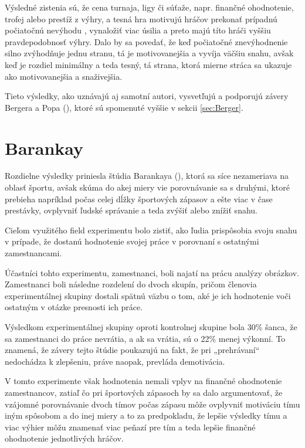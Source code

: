 \documentclass[
  digital, %
  oneside, %
  notable,   %
  lof,     %
  lot,     %
]{fithesis3}
\begin{document}
		Výsledné zistenia sú, že cena turnaja, ligy či súťaže, napr. finančné ohodnotenie, trofej alebo prestíž z výhry, a tesná hra motivujú hráčov prekonať prípadnú počiatočnú nevýhodu , vynaložiť viac úsilia a preto majú títo hráči vyššiu pravdepodobnosť výhry. \parencite[s.~20]{bergerhoff2015} Dalo by sa povedať, že keď počiatočné znevýhodnenie silno zvýhodňuje jednu stranu, tá je motivovanejšia a vyvíja väčšiu snahu, avšak keď je rozdiel minimálny a teda tesný, tá strana, ktorá mierne stráca sa ukazuje ako motivovanejšia a snaživejšia.
		
		Tieto výsledky, ako uznávajú aj samotní autori, vysvetľujú a podporujú závery Bergera a Popa (\citeyear{berger2011}), ktoré sú spomenuté vyššie v sekcii \ref{sec:Berger}.
		
		\section{Barankay}
		Rozdielne výsledky priniesla štúdia Barankaya (\citeyear{barankay2010}), ktorá sa síce nezameriava na oblasť športu, avšak skúma do akej miery vie porovnávanie sa s druhými, ktoré prebieha napríklad počas celej dĺžky športových zápasov a ešte viac v čase prestávky, ovplyvniť ľudské správanie a teda zvýšiť alebo znížiť snahu.
		
		Cieľom využitého field experimentu bolo zistiť, ako ľudia prispôsobia svoju snahu v prípade, že dostanú hodnotenie svojej práce v porovnaní s ostatnými zamestnancami. 
		
		Účastníci tohto experimentu, zamestnanci, boli najatí na prácu analýzy obrázkov. Zamestnanci boli následne rozdelení do dvoch skupín, pričom členovia experimentálnej skupiny dostali spätnú väzbu o tom, aké je ich hodnotenie voči ostatným v otázke presnosti ich práce. 
		
		Výsledkom experimentálnej skupiny oproti kontrolnej skupine bola 30\% šanca, že sa zamestnanci do práce nevrátia, a ak sa vrátia, sú o 22\% menej výkonní. To znamená, že závery tejto štúdie poukazujú na fakt, že pri „prehrávaní“ nedochádza k zlepšeniu, práve naopak, prevláda demotivácia. \parencite[s.~4]{barankay2010}
		
		V tomto experimente však hodnotenia nemali vplyv na finančné ohodnotenie zamestnancov, zatiaľ čo pri športových zápasoch by sa dalo argumentovať, že vzájomné porovnávanie dvoch tímov počas zápasu môže ovplyvniť motiváciu tímu iným spôsobom a do inej miery a to za predpokladu, že lepšie výsledky tímu a viac výhier môžu znamenať viac peňazí pre tím a teda lepšie finančné ohodnotenie jednotlivých hráčov.
		
\end{document}
